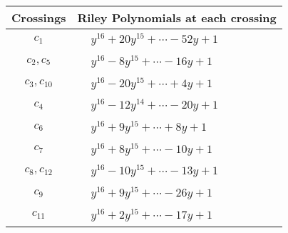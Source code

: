 \documentclass[1p]{elsarticle_modified}
\theoremstyle{definition}
\begin{document}
\begin{tabular}{m{50pt}|m{274pt}}
Crossings & \hspace{64pt}Riley Polynomials at each crossing \\
\hline $$\begin{aligned}c_{1}\end{aligned}$$&$\begin{aligned}
&y^{16}+20 y^{15}+\cdots-52 y+1
\end{aligned}$\\
\hline $$\begin{aligned}c_{2},c_{5}\end{aligned}$$&$\begin{aligned}
&y^{16}-8 y^{15}+\cdots-16 y+1
\end{aligned}$\\
\hline $$\begin{aligned}c_{3},c_{10}\end{aligned}$$&$\begin{aligned}
&y^{16}-20 y^{15}+\cdots+4 y+1
\end{aligned}$\\
\hline $$\begin{aligned}c_{4}\end{aligned}$$&$\begin{aligned}
&y^{16}-12 y^{14}+\cdots-20 y+1
\end{aligned}$\\
\hline $$\begin{aligned}c_{6}\end{aligned}$$&$\begin{aligned}
&y^{16}+9 y^{15}+\cdots+8 y+1
\end{aligned}$\\
\hline $$\begin{aligned}c_{7}\end{aligned}$$&$\begin{aligned}
&y^{16}+8 y^{15}+\cdots-10 y+1
\end{aligned}$\\
\hline $$\begin{aligned}c_{8},c_{12}\end{aligned}$$&$\begin{aligned}
&y^{16}-10 y^{15}+\cdots-13 y+1
\end{aligned}$\\
\hline $$\begin{aligned}c_{9}\end{aligned}$$&$\begin{aligned}
&y^{16}+9 y^{15}+\cdots-26 y+1
\end{aligned}$\\
\hline $$\begin{aligned}c_{11}\end{aligned}$$&$\begin{aligned}
&y^{16}+2 y^{15}+\cdots-17 y+1
\end{aligned}$\\
\hline
\end{tabular}\\~\\
\end{document}
